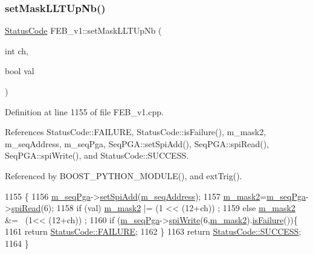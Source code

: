 \subsubsection{\texorpdfstring{set\+Mask\+L\+L\+T\+Up\+Nb()}{setMaskLLTUpNb()}}
{\footnotesize\ttfamily \hyperlink{classStatusCode}{Status\+Code} F\+E\+B\+\_\+v1\+::set\+Mask\+L\+L\+T\+Up\+Nb (\begin{DoxyParamCaption}\item[{int}]{ch,  }\item[{bool}]{val }\end{DoxyParamCaption})}



Definition at line 1155 of file F\+E\+B\+\_\+v1.\+cpp.



References Status\+Code\+::\+F\+A\+I\+L\+U\+RE, Status\+Code\+::is\+Failure(), m\+\_\+mask2, m\+\_\+seq\+Address, m\+\_\+seq\+Pga, Seq\+P\+G\+A\+::set\+Spi\+Add(), Seq\+P\+G\+A\+::spi\+Read(), Seq\+P\+G\+A\+::spi\+Write(), and Status\+Code\+::\+S\+U\+C\+C\+E\+SS.



Referenced by B\+O\+O\+S\+T\+\_\+\+P\+Y\+T\+H\+O\+N\+\_\+\+M\+O\+D\+U\+L\+E(), and ext\+Trig().


\begin{DoxyCode}
1155                                                  \{
1156   \hyperlink{classFEB__v1_a6c7804ac86796f233a8393043adf2e77}{m\_seqPga}->\hyperlink{classSeqPGA_ac998ce3a6d9b5f2e88cc8393f8c1df53}{setSpiAdd}(\hyperlink{classFEB__v1_a1c1eb093fd1733b9510fcf8bc5c7ad08}{m\_seqAddress});
1157   \hyperlink{classFEB__v1_a25f03f6de00618dd575fc1f77a9af9ee}{m\_mask2}=\hyperlink{classFEB__v1_a6c7804ac86796f233a8393043adf2e77}{m\_seqPga}->\hyperlink{classSeqPGA_ab3d0e5e5d4014bc7a92588a76b8713d4}{spiRead}(6);
1158   \textcolor{keywordflow}{if} (val)  \hyperlink{classFEB__v1_a25f03f6de00618dd575fc1f77a9af9ee}{m\_mask2} |= (1 << (12+ch))  ;
1159   \textcolor{keywordflow}{else}      \hyperlink{classFEB__v1_a25f03f6de00618dd575fc1f77a9af9ee}{m\_mask2} &= ~(1<< (12+ch)) ;
1160   \textcolor{keywordflow}{if} (\hyperlink{classFEB__v1_a6c7804ac86796f233a8393043adf2e77}{m\_seqPga}->\hyperlink{classSeqPGA_ad4421841ce4ce8b88ad13f63216f0743}{spiWrite}(6,\hyperlink{classFEB__v1_a25f03f6de00618dd575fc1f77a9af9ee}{m\_mask2}).\hyperlink{classStatusCode_a5dd22dc6eb2c52fc4cabc58f6dea2eb7}{isFailure}())\{
1161     \textcolor{keywordflow}{return} \hyperlink{classStatusCode_a6f565cbeadc76d14c72f047e5e85eb4ba3da73d4c469762eb9d3c960368252b26}{StatusCode::FAILURE};
1162   \}
1163   \textcolor{keywordflow}{return} \hyperlink{classStatusCode_a6f565cbeadc76d14c72f047e5e85eb4badd0da38d3ba0d922efd1f4619bc37ad8}{StatusCode::SUCCESS};  
1164 \}
\end{DoxyCode}
\mbox{\label{classFEB__v1_aec8198d5c03ddc5dd9151683f9506d00}} 
